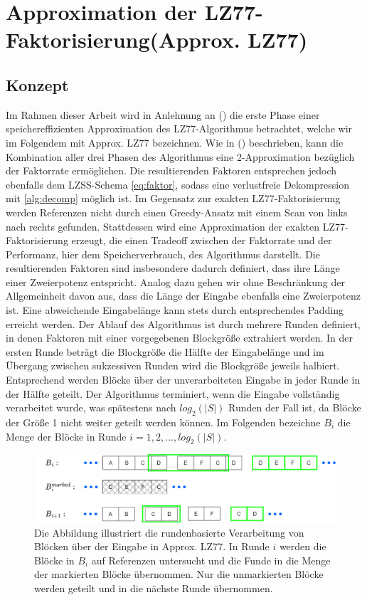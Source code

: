 \section{Approximation der LZ77-Faktorisierung(Approx. LZ77)}
\subsection{Konzept}
Im Rahmen dieser Arbeit wird in Anlehnung an (\cite{ApproxLZ77}) die erste Phase einer speichereffizienten Approximation des LZ77-Algorithmus betrachtet, welche wir im Folgendem
mit Approx. LZ77 bezeichnen. Wie in (\cite{ApproxLZ77}) beschrieben, kann die Kombination aller drei Phasen des Algorithmus eine 2-Approximation bezüglich der Faktorrate 
ermöglichen. Die resultierenden Faktoren entsprechen jedoch ebenfalls dem LZSS-Schema \ref{eq:faktor}, sodass eine verlustfreie Dekompression mit \ref{alg:decomp} möglich ist. 
Im Gegensatz zur exakten LZ77-Faktorisierung werden Referenzen nicht 
durch einen Greedy-Ansatz mit einem Scan von links nach rechts gefunden. Stattdessen wird eine Approximation der exakten LZ77-Faktorisierung erzeugt, die einen Tradeoff 
zwischen der Faktorrate und der Performanz, hier dem Speicherverbrauch, des Algorithmus darstellt. Die resultierenden Faktoren sind insbesondere dadurch definiert, dass ihre 
Länge einer Zweierpotenz entspricht. Analog dazu gehen wir ohne Beschränkung der Allgemeinheit davon aus, dass die Länge der Eingabe ebenfalls eine Zweierpotenz ist. Eine 
abweichende Eingabelänge kann stets durch entsprechendes Padding erreicht werden. 
Der Ablauf des Algorithmus ist durch mehrere Runden definiert, in denen Faktoren mit einer vorgegebenen Blockgröße extrahiert werden. In der ersten Runde beträgt die Blockgröße 
die Hälfte der Eingabelänge und im Übergang zwischen sukzessiven Runden wird die Blockgröße jeweils halbiert. Entsprechend werden Blöcke über der unverarbeiteten Eingabe
in jeder Runde in der Hälfte geteilt. Der Algorithmus terminiert, wenn die Eingabe vollständig verarbeitet wurde, was spätestens nach $log_2(|S|)$ Runden der Fall ist, da Blöcke 
der Größe 1 nicht weiter geteilt werden können. Im Folgenden bezeichne $B_i$ die Menge der Blöcke in Runde $i=1,2,...,log_2(|S|)$.
\begin{figure} [ht]
    \centering
    \includegraphics[width=1\textwidth]{Images/approxlz77.png}
    \caption{Die Abbildung illustriert die rundenbasierte Verarbeitung von Blöcken über der Eingabe in Approx. LZ77. In Runde $i$ werden die Blöcke in $B_i$ auf Referenzen untersucht und
    die Funde in die Menge der markierten Blöcke übernommen. Nur die unmarkierten Blöcke werden geteilt und in die nächste Runde übernommen.}
    \label{fig:roundapproxlz77}
\end{figure}
